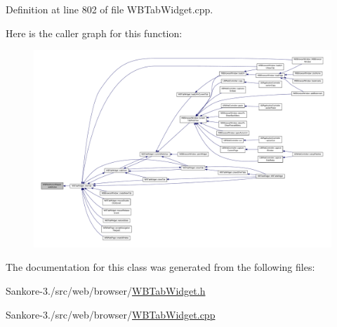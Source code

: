 Definition at line 802 of file W\-B\-Tab\-Widget.\-cpp.



Here is the caller graph for this function\-:
\nopagebreak
\begin{figure}[H]
\begin{center}
\leavevmode
\includegraphics[width=350pt]{df/ddf/class_w_b_web_action_mapper_a93022e933f82d86a438d9ccdfe72d93f_icgraph}
\end{center}
\end{figure}




The documentation for this class was generated from the following files\-:\begin{DoxyCompactItemize}
\item 
Sankore-\/3./src/web/browser/\hyperlink{_w_b_tab_widget_8h}{W\-B\-Tab\-Widget.\-h}\item 
Sankore-\/3./src/web/browser/\hyperlink{_w_b_tab_widget_8cpp}{W\-B\-Tab\-Widget.\-cpp}\end{DoxyCompactItemize}
